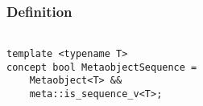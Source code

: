 
\subsubsection{Definition}

\begin{verbatim}

template <typename T>
concept bool MetaobjectSequence =
	Metaobject<T> &&
	meta::is_sequence_v<T>;

\end{verbatim}
